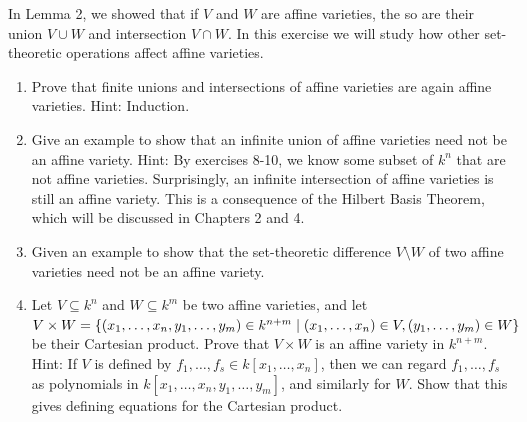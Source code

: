\begin{exercise}{15}
In Lemma 2, we showed that if $V$ and $W$ are affine varieties, the so are their union $V\cup W$ and intersection $V\cap W$. 
In this exercise we will study how other set-theoretic operations affect affine varieties.
\begin{enumerate}
    \item Prove that finite unions and intersections of affine varieties are again affine varieties. 
    Hint: Induction.
    \item Give an example to show that an infinite union of affine varieties need not be an affine variety. 
    Hint: By exercises 8-10, we know some subset of $k^n$ that are not affine varieties. 
    Surprisingly, an infinite intersection of affine varieties is still an affine variety. 
    This is a consequence of the Hilbert Basis Theorem, which will be discussed in Chapters 2 and 4.
    \item Given an example to show that the set-theoretic difference $V\setminus W$ of two affine varieties need not be an affine variety.
    \item Let $V\subseteq k^n$ and $W\subseteq k^m$ be two affine varieties, and let $V\times W = \{(x_1,\dots,x_n,y_1,\dots,y_m)\in k^{n+m}\mid(x_1,\dots,x_n)\in V,(y_1,\dots,y_m)\in W\}$ be their Cartesian product. 
    Prove that $V\times W$ is an affine variety in $k^{n+m}$. 
    Hint: If $V$ is defined by $f_1,\dots,f_s\in k[x_1,\dots,x_n]$, then we can regard $f_1,\dots,f_s$ as polynomials in $k[x_1,\dots,x_n,y_1,\dots,y_m]$, and similarly for $W$. Show that this gives defining equations for the Cartesian product.
\end{enumerate}
\end{exercise}
